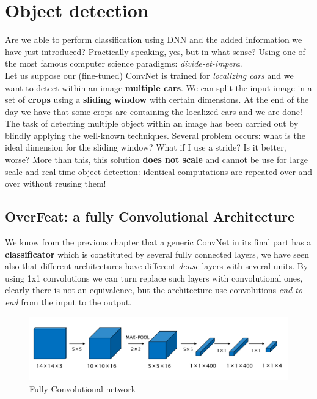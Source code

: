 \section{Object detection}
Are we able to perform classification using DNN and the added information we have just introduced? Practically speaking, yes, but in what sense? Using one of the most famous computer science paradigms: \textit{divide-et-impera}.\\
Let us suppose our (fine-tuned) ConvNet is trained for \textit{localizing cars} and we want to detect within an image \textbf{multiple cars}. We can split the input image in a set of \textbf{crops} using a \textbf{sliding window} with certain dimensions. At the end of the day we have that some crops are containing the localized cars and we are done! The task of detecting multiple object within an image has been carried out by blindly applying the well-known techniques. Several problem occurs: what is the ideal dimension for the sliding window? What if I use a stride? Is it better, worse? More than this, this solution \textbf{does not scale} and cannot be use for large scale and real time object detection: identical computations are repeated over and over without reusing them! 

\subsection{OverFeat: a fully Convolutional Architecture}
We know from the previous chapter that a generic ConvNet in its final part has a \textbf{classificator} which is constituted by several fully connected layers, we have seen also that different architectures have different \textit{dense} layers with several units. By using 1x1 convolutions we can turn replace such layers with convolutional ones, clearly there is not an equivalence, but the architecture use convolutions \textit{end-to-end} from the input to the output.

\begin{figure}
    \centering
    \includegraphics[scale=0.6]{img/FCN.png}
    \caption{Fully Convolutional network}
\end{figure}

